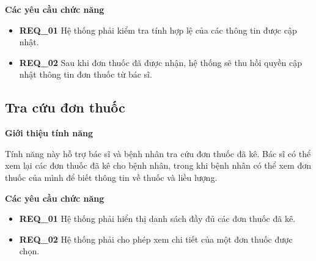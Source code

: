 \noindent \textbf{Các yêu cầu chức năng}
\begin{itemize}
  \item \textbf{REQ\_01} Hệ thống phải kiểm tra tính hợp lệ của các thông tin được cập nhật.
  \item \textbf{REQ\_02} Sau khi đơn thuốc đã được nhận, hệ thống sẽ thu hồi quyền cập nhật thông tin đơn thuốc từ bác sĩ.
\end{itemize}

\subsection{Tra cứu đơn thuốc}

\noindent \textbf{Giới thiệu tính năng}

Tính năng này hỗ trợ bác sĩ và bệnh nhân tra cứu đơn thuốc đã kê. Bác sĩ có thể xem lại các đơn thuốc đã kê cho bệnh nhân, trong khi bệnh nhân có thể xem đơn thuốc của mình để biết thông tin về thuốc và liều lượng.

\noindent \textbf{Các yêu cầu chức năng}
\begin{itemize}
  \item \textbf{REQ\_01} Hệ thống phải hiển thị danh sách đầy đủ các đơn thuốc đã kê.
  \item \textbf{REQ\_02} Hệ thống phải cho phép xem chi tiết của một đơn thuốc được chọn.
\end{itemize}
